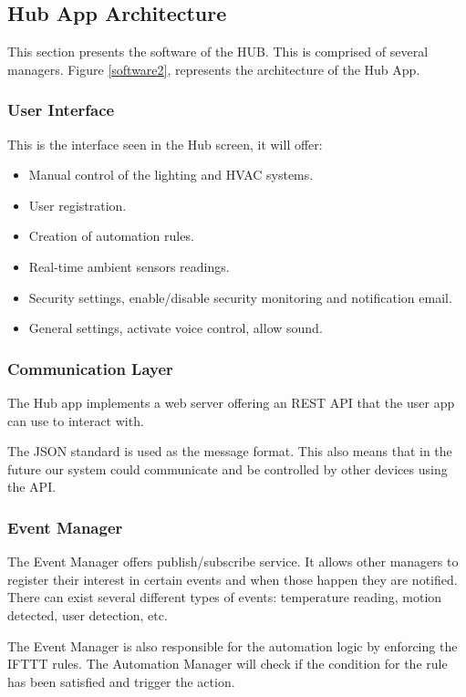 \subsection{Hub App Architecture}

This section presents the software of the HUB. This is comprised of several managers. Figure \ref{software2}, represents the architecture of the Hub App.

\subsubsection{User Interface}
This is the interface seen in the Hub screen, it will offer:

\begin{itemize}
  \item Manual control of the lighting and HVAC systems.
  \item User registration.
  \item Creation of automation rules.
  \item Real-time ambient sensors readings.
  \item Security settings, enable/disable security monitoring and notification email.
  \item General settings, activate voice control, allow sound.
   
\end{itemize}

\subsubsection{Communication Layer}

The Hub app implements a web server offering an \ac{REST} \ac{API} that the user app can use to interact with. 

The \ac{JSON} standard is used as the message format. This also means that in the future our system could communicate and be controlled by other devices using the \ac{API}.

\subsubsection{Event Manager}
The Event Manager offers publish/subscribe service. It allows other managers to register their interest in certain events and when those happen they are notified. There can exist several different types of events: temperature reading, motion detected, user detection, etc.

The Event Manager is also responsible for the automation logic by enforcing the \ac{IFTTT} rules. The Automation Manager will check if the condition for the rule has been satisfied and trigger the action. 

